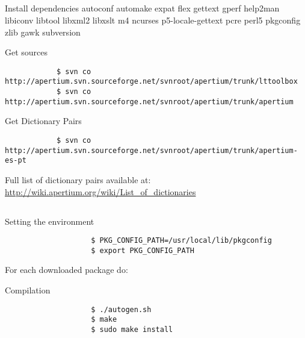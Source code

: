 \documentclass{beamer}
\begin{document}
\subsection{}
\begin{frame}[fragile]

	\begin{block}{Install dependencies}
		autoconf automake expat flex
		gettext gperf help2man libiconv libtool 
		libxml2 libxslt m4 ncurses p5-locale-gettext 
		pcre perl5 pkgconfig zlib gawk subversion
	\end{block}
	\begin{block}{Get sources}
		\lstset{
    		language=bash,
    		basicstyle=\ttfamily\small,
    		breaklines=true
		}
		\begin{lstlisting}
			$ svn co http://apertium.svn.sourceforge.net/svnroot/apertium/trunk/lttoolbox
			$ svn co http://apertium.svn.sourceforge.net/svnroot/apertium/trunk/apertium
		\end{lstlisting}
	\end{block}
	\begin{block}{Get Dictionary Pairs}
		\lstset{
    		language=bash,
    		basicstyle=\ttfamily\small,
    		breaklines=true
		}
		\begin{lstlisting}
			$ svn co http://apertium.svn.sourceforge.net/svnroot/apertium/trunk/apertium-es-pt
		\end{lstlisting}
		\tiny
		Full list of dictionary pairs available at: \url{http://wiki.apertium.org/wiki/List_of_dictionaries}
	\end{block}

\end{frame}

\subsection{}
\begin{frame}[fragile]	
			\begin{block}{Setting the environment}
				\lstset{
		    		language=bash,
		    		basicstyle=\ttfamily\small,
		    		breaklines=true
				}
				\begin{lstlisting}
					$ PKG_CONFIG_PATH=/usr/local/lib/pkgconfig
					$ export PKG_CONFIG_PATH			
				\end{lstlisting}
			\end{block}	
			For each downloaded package do:
			\begin{block}{Compilation}
				\lstset{
		    		language=bash,
		    		basicstyle=\ttfamily\small,
		    		breaklines=true
				}
				\begin{lstlisting}
					$ ./autogen.sh
					$ make
					$ sudo make install			
				\end{lstlisting}
			\end{block}			
\end{frame}
\end{document}
